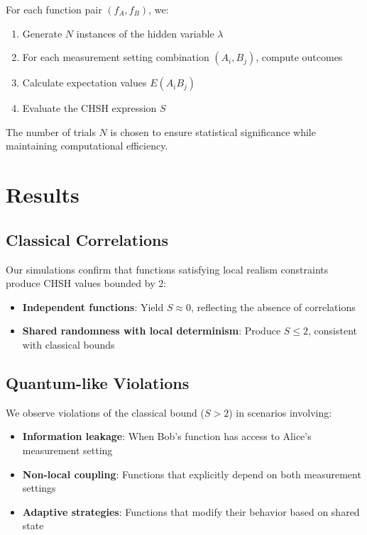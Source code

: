 \documentclass[11pt,a4paper]{article}
\begin{document}
For each function pair $(f_A, f_B)$, we:

\begin{enumerate}
\item Generate $N$ instances of the hidden variable $\lambda$
\item For each measurement setting combination $(A_i, B_j)$, compute outcomes
\item Calculate expectation values $E(A_iB_j)$
\item Evaluate the CHSH expression $S$
\end{enumerate}

The number of trials $N$ is chosen to ensure statistical significance while maintaining computational efficiency.

\section{Results}

\subsection{Classical Correlations}

Our simulations confirm that functions satisfying local realism constraints produce CHSH values bounded by 2:

\begin{itemize}
\item \textbf{Independent functions}: Yield $S \approx 0$, reflecting the absence of correlations
\item \textbf{Shared randomness with local determinism}: Produce $S \leq 2$, consistent with classical bounds
\end{itemize}

\subsection{Quantum-like Violations}

We observe violations of the classical bound ($S > 2$) in scenarios involving:

\begin{itemize}
\item \textbf{Information leakage}: When Bob's function has access to Alice's measurement setting
\item \textbf{Non-local coupling}: Functions that explicitly depend on both measurement settings
\item \textbf{Adaptive strategies}: Functions that modify their behavior based on shared state
\end{itemize}
\end{document}
